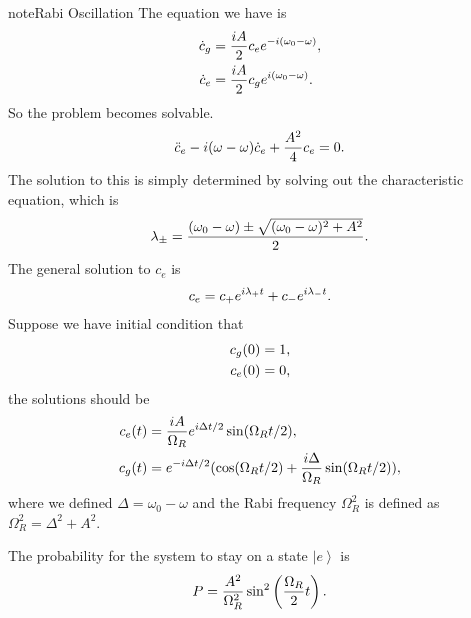 \documentclass[letterpaper,12pt,english]{sphinxmanual}
\newcommand{\ket}[1]{\left| #1\right\rangle}
\begin{document}
\begin{notice}{note}{Rabi Oscillation}
The equation we have is
\begin{gather}
\begin{split}\dot c_g & = \frac{iA}{2} c_e e^{-i(\omega_0-\omega)}, \\
\dot c_e & = \frac{iA}{2} c_g e^{i(\omega_0 - \omega)}.\end{split}\notag
\end{gather}
So the problem becomes solvable.
\begin{gather}
\begin{split}\ddot c_e - i(\omega - \omega) \dot c_e + \frac{A^2}{4}c_e = 0.\end{split}\notag
\end{gather}
The solution to this is simply determined by solving out the characteristic equation, which is
\begin{gather}
\begin{split}\lambda_{\pm} = \frac{(\omega_0 - \omega) \pm \sqrt{ (\omega_0 - \omega)^2 + A^2 } }{2} .\end{split}\notag
\end{gather}
The general solution to \(c_e\) is
\begin{gather}
\begin{split}c_e = c_+ e^{i\lambda_+ t} + c_- e^{i\lambda_- t}.\end{split}\notag
\end{gather}
Suppose we have initial condition that
\begin{gather}
\begin{split}c_g(0) & = 1,\\
c_e(0) & = 0,\end{split}\notag
\end{gather}
the solutions should be
\begin{gather}
\begin{split}c_e(t) & = \frac{iA}{\Omega_R} e^{i\Delta t/2} \sin(\Omega_R t/2) ,\\
c_g(t) &=  e^{-i\Delta t/2}(\cos(\Omega_R t/2) + \frac{i\Delta}{\Omega_R} \sin(\Omega_R t/2) ),\end{split}\notag
\end{gather}
where we defined \(\Delta = \omega_0-\omega\) and the Rabi frequency \(\Omega_R^2\) is defined as \(\Omega_R^2 = \Delta^2 + A^2\).

The probability for the system to stay on a state \(\ket{e}\) is
\begin{gather}
\begin{split}P = \frac{A^2}{\Omega_R^2} \sin^2\left( \frac{\Omega_R }{2} t \right).\end{split}\notag
\end{gather}\end{notice}
\end{document}
